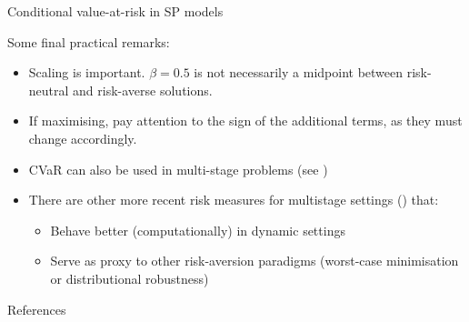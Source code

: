 \begin{frame}{Conditional value-at-risk in SP models}

	Some final practical remarks:
	\begin{itemize}[<+->]
		\item Scaling is important. $\beta = 0.5$ is not necessarily a \alert{midpoint} between risk-neutral and risk-averse solutions.
		\item If maximising, pay attention to the \alert{sign} of the additional terms, as they must change accordingly.
		\item CVaR can also be used in \alert{multi-stage} problems (see \cite{SHAPIRO201163})
		\item There are other more recent risk measures for multistage settings (\cite{dowson2022incorporating}) that:
		\begin{itemize}
			\item Behave better (computationally) in \alert{dynamic} settings
			\item Serve as proxy to \alert{other risk-aversion paradigms} (worst-case minimisation or distributional robustness)
		\end{itemize} 
	\end{itemize}

\end{frame}




\begin{frame}[allowframebreaks]{References}

	
	

\end{frame}